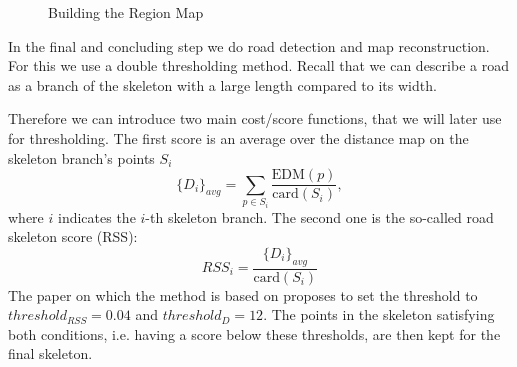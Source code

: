 \documentclass[10pt,conference,compsocconf]{IEEEtran}
\begin{document}
\begin{figure}[tp]
	\hspace{0.025\linewidth}
	\hspace{0.025\linewidth}
	\caption{Building the Region Map}
	\label{fig:skeleton_map}
\end{figure}

In the final and concluding step we do road detection and map reconstruction. For this we use a double thresholding method. Recall that we can describe a road as a branch of the skeleton with a large length compared to its width. 

Therefore we can introduce two main cost/score functions, that we will later use for thresholding. The first score is an average over the distance map on the skeleton branch's points $S_{i}$
$$
\{D_i\}_{avg} = \sum_{p \in S_{i}}{\frac{\textrm{EDM}(p)}{\textrm{card}(S_{i})}},
$$
where $i$ indicates the $i$-th skeleton branch. The second one is the so-called road skeleton score (RSS):
$$
RSS_{i} = \frac{{\{D_i\}}_{avg}}{\textrm{card}(S_{i})}
$$
The paper on which the method is based on \cite{GaZeScPo11} proposes to set the threshold to $threshold_{RSS} = 0.04$ and $threshold_{D} = 12$. The points in the skeleton satisfying both conditions, i.e. having a score below these thresholds, are then kept for the final skeleton.
\end{document}
